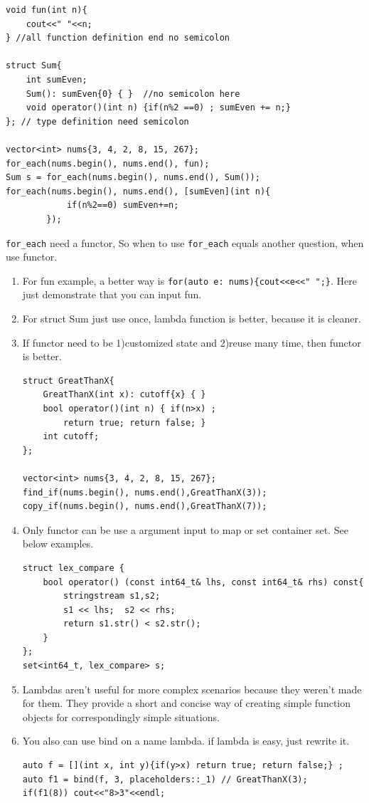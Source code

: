 \documentclass[a4paper,11pt,twoside]{book}
\begin{document}
\begin{lstlisting}[numbers=none]
void fun(int n){
	cout<<" "<<n;
} //all function definition end no semicolon

struct Sum{
	int sumEven;
	Sum(): sumEven{0} { }  //no semicolon here
	void operator()(int n) {if(n%2 ==0) ; sumEven += n;}
}; // type definition need semicolon
	
vector<int> nums{3, 4, 2, 8, 15, 267};
for_each(nums.begin(), nums.end(), fun);
Sum s = for_each(nums.begin(), nums.end(), Sum());
for_each(nums.begin(), nums.end(), [sumEven](int n){
			if(n%2==0) sumEven+=n;
		});
\end{lstlisting}
	

\texttt{for\_each} need a functor, So when to use \texttt{for\_each} equals another question, when use functor.
		\begin{enumerate}
			\item For fun example, a better way is \texttt{for(auto e: nums)\{cout<<e<<" ";\}}. Here just demonstrate that  you can input fun.
			
			\item For struct Sum just use once, lambda function is better, because it is cleaner.
			
			\item If functor need to be 1)customized state and 2)reuse many time, then functor is better.
\begin{lstlisting}[numbers=none]
struct GreatThanX{
	GreatThanX(int x): cutoff{x} { } 
	bool operator()(int n) { if(n>x) ; 
		return true; return false; }
	int cutoff;
};

vector<int> nums{3, 4, 2, 8, 15, 267};
find_if(nums.begin(), nums.end(),GreatThanX(3));
copy_if(nums.begin(), nums.end(),GreatThanX(7));
\end{lstlisting}
			\item Only functor can be use a argument input to map or set container set. See below examples.
			
\begin{lstlisting}[numbers=none]
struct lex_compare {
	bool operator() (const int64_t& lhs, const int64_t& rhs) const{
		stringstream s1,s2;        
		s1 << lhs;  s2 << rhs;
		return s1.str() < s2.str();
	}
};
set<int64_t, lex_compare> s;
\end{lstlisting}
			
			\item Lambdas aren't useful for more complex scenarios because they weren't made for them. They provide a short and concise way of creating simple function objects for correspondingly simple situations.
			
			\item You also can use bind on a name lambda. if lambda is easy, just rewrite it. 
\begin{lstlisting}[numbers=none]
auto f = [](int x, int y){if(y>x) return true; return false;} ;
auto f1 = bind(f, 3, placeholders::_1) // GreatThanX(3);
if(f1(8)) cout<<"8>3"<<endl;
\end{lstlisting}			
		\end{enumerate}
		
\end{document}
